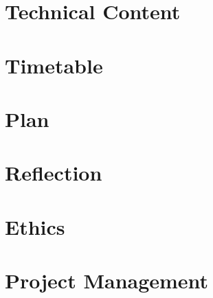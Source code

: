 \documentclass[11pt]{article}
\begin{document}
\section*{Technical Content}

\section*{Timetable}

\section*{Plan}

\section*{Reflection}

\section*{Ethics}

\section*{Project Management}


\clearpage
{}
\end{document}
